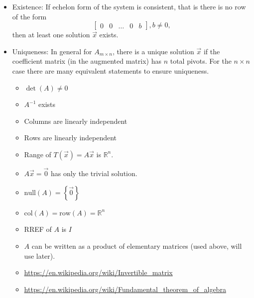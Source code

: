 \documentclass{article}
\theoremstyle{remark}
\begin{document}
\begin{enumerate}
\begin{enumerate}
\begin{itemize}
\item Existence: If echelon form of the system is consistent, that is there is no row of the form
\[
\left[
\begin{array}{cccc|c}
0 & 0 & \dots & 0 & b
\end{array}
\right], b \neq 0,
\]
then at least one solution $\vec{x}$ exists.
\item Uniqueness: In general for $A_{m \times n}$, there is a unique solution $\vec{x}$ if the coefficient matrix (in the augmented matrix) has $n$ total pivots. For the $n \times n$ case there are many equivalent statements to ensure uniqueness.
\begin{itemize}
\item $\det(A) \neq 0$
\item $A^{-1}$ exists
\item Columns are linearly independent
\item Rows are linearly independent
\item Range of $T(\vec{x}) = A\vec{x}$ is $\mathbb{R}^n$.
\item $A\vec{x} = \vec{0}$ has only the trivial solution.
\item $\text{null}(A) = \left\{ \vec{0} \right\}$
\item $\text{col}(A) = \text{row}(A) = \mathbb{R}^n$
\item RREF of $A$ is $I$
\item $A$ can be written as a product of elementary matrices (used above, will use later).
\item \url{https://en.wikipedia.org/wiki/Invertible_matrix}
\item \url{https://en.wikipedia.org/wiki/Fundamental_theorem_of_algebra}
\end{itemize}
\end{itemize}
\end{enumerate}


\end{enumerate}
\end{document}
